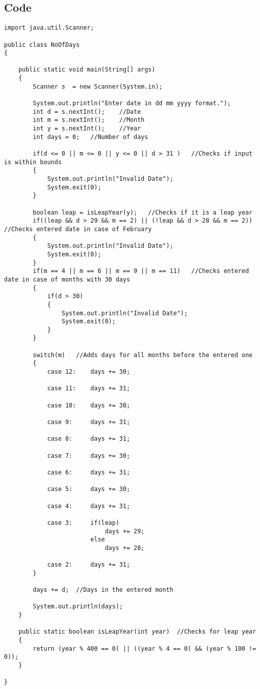 \documentclass[ProgramminAssignment.tex]{subfiles}
\begin{document}
\subsection{Code}
\begin{lstlisting}
import java.util.Scanner;

public class NoOfDays
{

	public static void main(String[] args)
	{
		Scanner s  = new Scanner(System.in);
		
		System.out.println("Enter date in dd mm yyyy format.");
		int d = s.nextInt();	//Date
		int m = s.nextInt();	//Month
		int y = s.nextInt();	//Year
		int days = 0;	//Number of days
		
		if(d <= 0 || m <= 0 || y <= 0 || d > 31 )	//Checks if input is within bounds
		{
			System.out.println("Invalid Date");
			System.exit(0);
		}

		boolean leap = isLeapYear(y);	//Checks if it is a leap year
		if((leap && d > 29 && m == 2) || (!leap && d > 28 && m == 2))	//Checks entered date in case of February
		{
			System.out.println("Invalid Date");
			System.exit(0);
		}
		if(m == 4 || m == 6 || m == 9 || m == 11)	//Checks entered date in case of months with 30 days
		{
			if(d > 30)
			{
				System.out.println("Invalid Date");
				System.exit(0);
			}
		}
		
		switch(m)	//Adds days for all months before the entered one
		{
			case 12:	days += 30;
			
			case 11:	days += 31;
			
			case 10:	days += 30;
			
			case 9:		days += 31;
			
			case 8:		days += 31;
			
			case 7:		days += 30;
			
			case 6:		days += 31;
			
			case 5:		days += 30;
			
			case 4:		days += 31;
			
			case 3:		if(leap)
							days += 29;
						else
							days += 28;
			
			case 2:		days += 31;
		}
		
		days += d;	//Days in the entered month
		
		System.out.println(days);
	}

	public static boolean isLeapYear(int year)	//Checks for leap year
	{
		return (year % 400 == 0) || ((year % 4 == 0) && (year % 100 != 0));
	}
	
}
\end{lstlisting}
\end{document}
